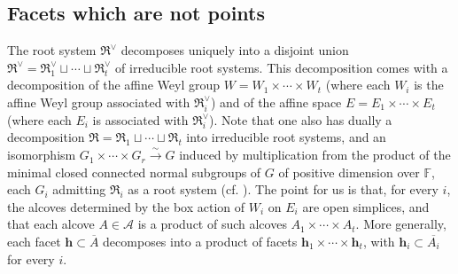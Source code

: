 \documentclass[11pt]{amsart}
\theoremstyle{plain}
\theoremstyle{remark}
\numberwithin{equation}{section}
\begin{document}
	\subsection{Facets which are not points}\label{Facets which are not points} The root system $\mathfrak{R}^\vee$ decomposes uniquely into a disjoint union $\mathfrak{R}^\vee=\mathfrak{R}^\vee_1\sqcup \cdots\sqcup\mathfrak{R}^\vee_t$ of irreducible root systems. This decomposition comes with a decomposition of the affine Weyl group $W= W_1\times\cdots \times W_t$ (where each $W_i$ is the affine Weyl group associated with $\mathfrak{R}_i^\vee$) and of the affine space $E= E_1\times \cdots\times E_t$ (where each $E_i$ is associated with $\mathfrak{R}_i^\vee$). Note that one also has dually a decomposition $\mathfrak{R}=\mathfrak{R}_1\sqcup \cdots\sqcup\mathfrak{R}_t$ into irreducible root systems, and an isomorphism $G_1\times\cdots\times G_r\xrightarrow{\sim} G$ induced by multiplication from the product of the minimal closed connected normal subgroups of $G$ of positive dimension over $\mathbb{F}$, each $G_i$ admitting $\mathfrak{R}_i$ as a root system (cf. \cite[Theorem and Corollary 27.5]{humphreys1975linear}). The point for us is that, for every $i$, the alcoves determined by the box action of $W_i$ on $E_i$ are open simplices, and that each alcove $A\in\mathcal{A}$ is a product of such alcoves $A_1\times\cdots\times A_t$. More generally, each facet $\mathbf{h}\subset \overline{A}$ decomposes into a product of facets $\mathbf{h}_1\times\cdots\times\mathbf{h}_t$, with $\mathbf{h}_i\subset\overline{A_i}$ for every $i$.
	
\end{document}
